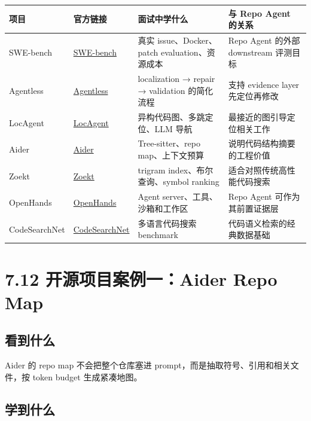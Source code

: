 \documentclass[UTF8,12pt,openany]{ctexbook}
\begin{document}
\begin{center}
\small
\begin{longtable}{|p{}|p{}|p{}|p{}|}
\toprule
项目 & 官方链接 & 面试中学什么 & 与 Repo Agent 的关系 \\
\midrule
SWE-bench & \href{https://github.com/SWE-bench/SWE-bench}{SWE-bench} & 真实 issue、Docker、patch evaluation、资源成本 & Repo Agent 的外部 downstream 评测目标 \\
Agentless & \href{https://github.com/OpenAutoCoder/Agentless}{Agentless} & localization → repair → validation 的简化流程 & 支持 evidence layer 先定位再修改 \\
LocAgent & \href{https://github.com/gersteinlab/LocAgent}{LocAgent} & 异构代码图、多跳定位、LLM 导航 & 最接近的图引导定位相关工作 \\
Aider & \href{https://github.com/Aider-AI/aider}{Aider} & Tree-sitter、repo map、上下文预算 & 说明代码结构摘要的工程价值 \\
Zoekt & \href{https://github.com/sourcegraph/zoekt}{Zoekt} & trigram index、布尔查询、symbol ranking & 适合对照传统高性能代码搜索 \\
OpenHands & \href{https://github.com/OpenHands/OpenHands}{OpenHands} & Agent server、工具、沙箱和工作区 & Repo Agent 可作为其前置证据层 \\
CodeSearchNet & \href{https://github.com/github/CodeSearchNet}{CodeSearchNet} & 多语言代码搜索 benchmark & 代码语义检索的经典数据基础 \\
\bottomrule
\end{longtable}
\end{center}

\section{7.12 开源项目案例一：Aider Repo Map}

\subsection{看到什么}

Aider 的 repo map 不会把整个仓库塞进 prompt，而是抽取符号、引用和相关文件，按 token budget 生成紧凑地图。\par

\subsection{学到什么}
\end{document}
